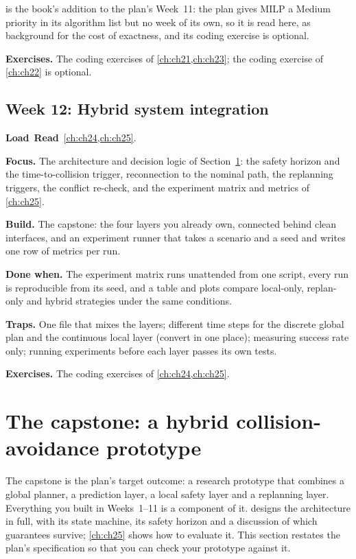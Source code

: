  is the book's addition to the plan's Week~11: the plan gives MILP a
Medium priority in its algorithm list but no week of its own, so it is read here, as
background for the cost of exactness, and its coding exercise is optional.

\textbf{Exercises.} The coding exercises of \cref{ch:ch21,ch:ch23}; the coding exercise of
\cref{ch:ch22} is optional.

\subsection{Week 12: Hybrid system integration}
\label{sec:appA-week12}
\noindent\textbf{Load}\ \quad\textbf{Read}\ \cref{ch:ch24,ch:ch25}.

\textbf{Focus.} The architecture and decision logic of Section~\ref{sec:appA-capstone}: the safety
horizon and the time-to-collision trigger, reconnection to the nominal path, the replanning
triggers, the conflict re-check, and the experiment matrix and metrics of \cref{ch:ch25}.

\textbf{Build.} The capstone: the four layers you already own, connected behind clean
interfaces, and an experiment runner that takes a scenario and a seed and writes one row of
metrics per run.

\textbf{Done when.} The experiment matrix runs unattended from one script, every run is
reproducible from its seed, and a table and plots compare local-only, replan-only and hybrid
strategies under the same conditions.

\textbf{Traps.} One file that mixes the layers; different time steps for the discrete global
plan and the continuous local layer (convert in one place); measuring success rate only;
running experiments before each layer passes its own tests.

\textbf{Exercises.} The coding exercises of \cref{ch:ch24,ch:ch25}.

\section{The capstone: a hybrid collision-avoidance prototype}
\label{sec:appA-capstone}

The capstone is the plan's target outcome: a research prototype that combines a global
planner, a prediction layer, a local safety layer and a replanning layer.
Everything you built in Weeks~1--11 is a component of it.  designs the
architecture in full, with its state machine, its safety horizon and a discussion of which
guarantees survive; \cref{ch:ch25} shows how to evaluate it. This section restates the
plan's specification so that you can check your prototype against it.

